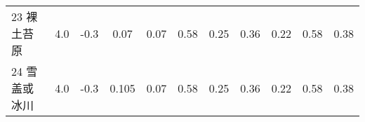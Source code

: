 \begin{landscape}
\begin{table}[htbp]
\begin{tabular}{@{}lcccccccccc@{}}
        23 裸土苔原    & 4.0        & -0.3                                                                         & 0.07                                                                                                            & 0.07                                                                                                            & 0.58                                                                                                            & 0.25                                                                                                            & 0.36                                                                                                            & 0.22                                                                                                            & 0.58                                                                                                            & 0.38                                                                                                            \\
        24 雪盖或冰川   & 4.0        & -0.3                                                                         & 0.105                                                                                                           & 0.07                                                                                                            & 0.58                                                                                                            & 0.25                                                                                                            & 0.36                                                                                                            & 0.22                                                                                                            & 0.58                                                                                                            & 0.38                                                                                                            \\\bottomrule
                \end{tabular}
\end{table}
\end{landscape}


